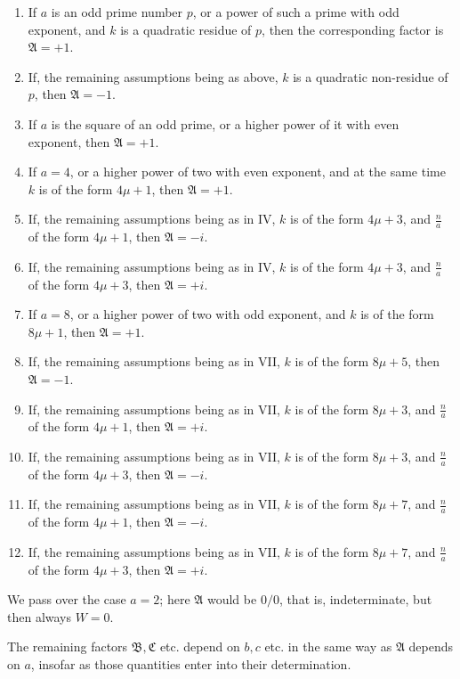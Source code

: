 \documentclass[12pt]{article}
\begin{document}
\begin{enumerate}[label=\Roman*.,leftmargin=2.5em]
\item If $a$ is an odd prime number $p$, or a power of such a prime with odd exponent, and $k$ is a quadratic residue of $p$, then the corresponding factor is $\mathfrak A=+1$.
\item If, the remaining assumptions being as above, $k$ is a quadratic non-residue of $p$, then $\mathfrak A=-1$.
\item If $a$ is the square of an odd prime, or a higher power of it with even exponent, then $\mathfrak A=+1$.
\item If $a=4$, or a higher power of two with even exponent, and at the same time $k$ is of the form $4\mu+1$, then $\mathfrak A=+1$.
\item If, the remaining assumptions being as in IV, $k$ is of the form $4\mu+3$, and $\frac{n}{a}$ of the form $4\mu+1$, then $\mathfrak A=-i$.
\item If, the remaining assumptions being as in IV, $k$ is of the form $4\mu+3$, and $\frac{n}{a}$ of the form $4\mu+3$, then $\mathfrak A=+i$.
\item If $a=8$, or a higher power of two with odd exponent, and $k$ is of the form $8\mu+1$, then $\mathfrak A=+1$.
\item If, the remaining assumptions being as in VII, $k$ is of the form $8\mu+5$, then $\mathfrak A=-1$.
\item If, the remaining assumptions being as in VII, $k$ is of the form $8\mu+3$, and $\frac{n}{a}$ of the form $4\mu+1$, then $\mathfrak A=+i$.
\item If, the remaining assumptions being as in VII, $k$ is of the form $8\mu+3$, and $\frac{n}{a}$ of the form $4\mu+3$, then $\mathfrak A=-i$.
\item If, the remaining assumptions being as in VII, $k$ is of the form $8\mu+7$, and $\frac{n}{a}$ of the form $4\mu+1$, then $\mathfrak A=-i$.
\item If, the remaining assumptions being as in VII, $k$ is of the form $8\mu+7$, and $\frac{n}{a}$ of the form $4\mu+3$, then $\mathfrak A=+i$.
\end{enumerate}

We pass over the case $a=2$; here $\mathfrak A$ would be $0/0$, that is, indeterminate, but then always $W=0$.

The remaining factors $\mathfrak B,\mathfrak C$ etc. depend on $b,c$ etc. in the same way as $\mathfrak A$ depends on $a$, insofar as those quantities enter into their determination.
\end{document}
